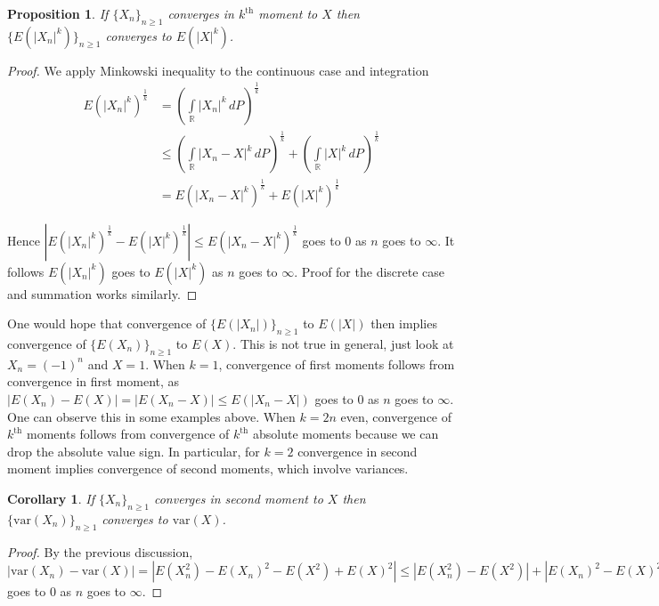 \documentclass[12pt]{amsart}
\newtheorem{proposition}[theorem]{Proposition}
\newtheorem{corollary}[theorem]{Corollary}
\theoremstyle{definition}
\begin{document}
\begin{proposition} \label{convergenc_in_kth_moment_convergence_of_kth_absolute_moment} If $\{X_n\}_{n \geq 1}$ converges in $k^{\text{th}}$ moment to $X$ then $\{E(|X_n|^k)\}_{n \geq 1}$ converges to $E(|X|^k)$.
\end{proposition}
\begin{proof} We apply Minkowski inequality to the continuous case and integration
\begin{align*}
E(|X_n|^k)^{\frac{1}{k}} & = \left( \int\limits_{\mathbb{R}} |X_n|^k \, dP \right)^{\frac{1}{k}} \\
 & \leq \left( \int\limits_{\mathbb{R}} |X_n - X|^k \, dP \right)^{\frac{1}{k}} + \left( \int\limits_{\mathbb{R}} |X|^k \, dP \right)^{\frac{1}{k}} \\
 & = E(|X_n - X|^k)^{\frac{1}{k}} + E(|X|^k)^{\frac{1}{k}}
\end{align*}

Hence $|E(|X_n|^k)^{\frac{1}{k}} - E(|X|^k)^{\frac{1}{k}}| \leq E(|X_n - X|^k)^{\frac{1}{k}}$ goes to 0 as $n$ goes to $\infty$. It follows $E(|X_n|^k)$ goes to $E(|X|^k)$ as $n$ goes to $\infty$. Proof for the discrete case and summation works similarly.
\end{proof}

One would hope that convergence of $\{E(|X_n|)\}_{n \geq 1}$ to $E(|X|)$ then implies convergence of $\{E(X_n)\}_{n \geq 1}$ to $E(X)$. This is not true in general, just look at $X_n = (-1)^n$ and $X = 1$. When $k = 1$, convergence of first moments follows from convergence in first moment, as $|E(X_n) - E(X)| = |E(X_n - X)| \leq E(|X_n - X|)$ goes to 0 as $n$ goes to $\infty$. One can observe this in some examples above. When $k = 2n$ even, convergence of $k^{\text{th}}$ moments follows from convergence of $k^{\text{th}}$ absolute moments because we can drop the absolute value sign. In particular, for $k = 2$ convergence in second moment implies convergence of second moments, which involve variances.

\begin{corollary} \label{convergence_in_2nd_moment_convergence_of_variances} If $\{X_n\}_{n \geq 1}$ converges in second moment to $X$ then $\{\text{var}(X_n)\}_{n \geq 1}$ converges to $\text{var}(X)$.
\end{corollary}
\begin{proof} By the previous discussion, $|\text{var}(X_n) - \text{var}(X)| = |E(X_n^2) - E(X_n)^2 - E(X^2) + E(X)^2| \leq |E(X_n^2) - E(X^2)| + |E(X_n)^2 - E(X)^2|$ goes to 0 as $n$ goes to $\infty$.
\end{proof}
\end{document}
